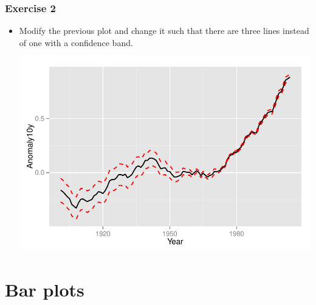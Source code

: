 \documentclass{beamer}\usepackage[]{graphicx}\usepackage[]{color}
\newenvironment{knitrout}{}{} %
\begin{document}
\begin{frame}[fragile]
\frametitle{Exercise 2}
\begin{itemize}
\item Modify the previous plot and change it such that there are three lines instead of one with a confidence band.
\begin{knitrout}\footnotesize
{}\color{fgcolor}

{\centering \includegraphics[width=.75\linewidth]{figure/ex2} 

}



\end{knitrout}


\end{itemize}
\end{frame}


\section*{Bar plots}
\frame{\sectionpage}

\end{document}
